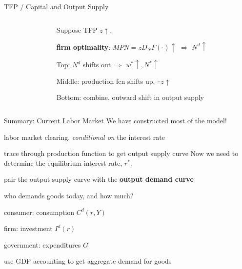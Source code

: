 \documentclass[11pt,aspectratio=169,usenames,dvipsnames]{beamer}
\let\tempone\itemize
\let\temptwo\enditemize
\renewenvironment{itemize}{\tempone\addtolength{\itemsep}{\fill}}{\temptwo}
\begin{document}
\begin{frame}{TFP / Capital and Output Supply}
\begin{columns}
\begin{column}{0.5\textwidth}
{\begin{tikzpicture}
            \end{tikzpicture}}
        \end{column}
        \begin{column}{0.5\textwidth}
            Suppose TFP $ z \uparrow  $.
            \begin{itemize}
                \item \textbf{firm optimality}: $ MPN = z D_{N}F( \cdot ) \uparrow  $ $ \Rightarrow  $ $ N^{d} \uparrow  $
                \item Top: $ N^{d} $ shifts out $ \Rightarrow  $ $ w^{*} \uparrow, N^{*} \uparrow  $
                \item Middle: production fcn shifts up, $ \because z \uparrow $
                \item Bottom: combine, outward shift in output supply
            \end{itemize}
        \end{column}
    \end{columns}
\end{frame}

\begin{frame}{Summary: Current Labor Market}
\label{slide:Summary__Current_Labor_Market}
    We have constructed most of the model!
    \begin{itemize}
        \item \alert{labor market clearing}, \textit{conditional on} the interest rate
        \item trace through production function to get \alert{output supply curve}
    \end{itemize}
    Now we need to determine the \alert{equilibrium interest rate}, $ r^{*} $.
    \begin{itemize}
        \item pair the \alert{output supply curve} with the \textbf{output demand curve}
        \item who demands goods today, and how much?
        \begin{itemize}
            \item consumer: consumption $ C^{d}( r, Y ) $
            \item firm: investment $ I^{d}( r ) $
            \item government: expenditures $ G $
            \item use GDP accounting to get aggregate demand for goods
        \end{itemize}
    \end{itemize}
\end{frame}
\end{document}

